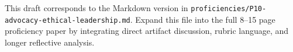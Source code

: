 \documentclass[12pt]{article}
\begin{document}
\begin{titlepage}\begin{center}\vspace*{0.2\textheight}{\Large\bfseries Proficiency 10: Advocacy and Ethical Leadership\par}\vspace{2em}{\PortfolioAuthor\par}{\PortfolioAffiliation\par}{\PortfolioProgram\par}\vspace{2em}{\PortfolioDate\par}\end{center}\end{titlepage}
This draft corresponds to the Markdown version in \texttt{proficiencies/P10-advocacy-ethical-leadership.md}. Expand this file into the full 8--15 page proficiency paper by integrating direct artifact discussion, rubric language, and longer reflective analysis.
\end{document}

